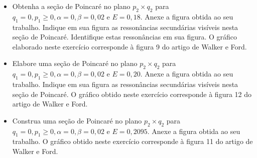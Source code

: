 \documentclass[a4paper]{article}
\begin{document}
\begin{center}
\begin{itemize}
    \item[(2.9)] Obtenha a seção de Poincaré no plano \( p_2 \times q_2 \) para \( q_1 = 0, p_1 \geq 0, \alpha = 0, \beta = 0,02 \) e \( E = 0,18 \). Anexe a figura obtida ao seu trabalho. Indique em sua figura as ressonâncias secundárias visíveis nesta seção de Poincaré. Identifique estas ressonâncias em sua figura. O gráfico elaborado neste exercício corresponde à figura 9 do artigo de Walker e Ford.
    \begin{answer}[Ítem 2.9]
    \end{answer}

    \item[(2.10)] Elabore uma seção de Poincaré no plano \( p_2 \times q_2 \) para \( q_1 = 0, p_1 \geq 0, \alpha = 0, \beta = 0,02 \) e \( E = 0,20 \). Anexe a figura obtida ao seu trabalho. Indique em sua figura as ressonâncias secundárias visíveis nesta seção de Poincaré. O gráfico obtido neste exercício corresponde à figura 12 do artigo de Walker e Ford.
    \begin{answer}[Ítem 2.10]
    \end{answer}

    \item[(2.11)] Construa uma seção de Poincaré no plano \( p_2 \times q_2 \) para \( q_1 = 0, p_1 \geq 0, \alpha = 0, \beta = 0,02 \) e \( E = 0,2095 \). Anexe a figura obtida ao seu trabalho. O gráfico obtido neste exercício corresponde à figura 11 do artigo de Walker e Ford.
    \begin{answer}[Ítem 2.11]
    \end{answer}
\end{itemize}
\end{center}
\end{document}
